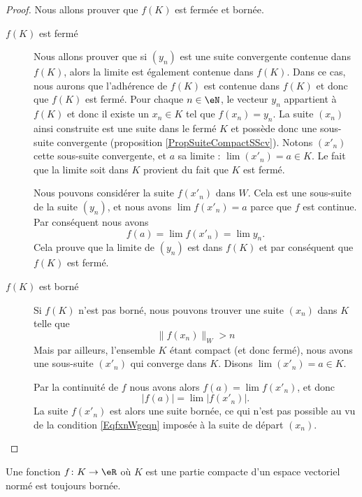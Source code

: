 \begin{proof}
	Nous allons prouver que $f(K)$ est fermée et bornée.
	\begin{description}
		\item[$f(K)$ est fermé] Nous allons prouver que si $(y_n)$ est une suite convergente contenue dans $f(K)$, alors la limite est également contenue dans $f(K)$. Dans ce cas, nous aurons que l'adhérence de $f(K)$ est contenue dans $f(K)$ et donc que $f(K)$ est fermé. Pour chaque $n\in\eN$, le vecteur $y_n$ appartient à $f(K)$ et donc il existe un $x_n\in K$ tel que $f(x_n)=y_n$. La suite $(x_n)$ ainsi construite est une suite dans le fermé $K$ et possède donc une sous-suite convergente (proposition \ref{PropSuiteCompactSScv}). Notons $(x'_n)$ cette sous-suite convergente, et $a$ sa limite : $\lim(x'_n)=a\in K$. Le fait que la limite soit dans $K$ provient du fait que $K$ est fermé.

			Nous pouvons considérer la suite $f(x'_n)$ dans $W$. Cela est une sous-suite de la suite $(y_n)$, et nous avons $\lim f(x'_n)=a$ parce que $f$ est continue. Par conséquent nous avons
			\begin{equation}
				f(a)=\lim f(x'_n)=\lim y_n.
			\end{equation}
			Cela prouve que la limite de $(y_n)$ est dans $f(K)$ et par conséquent que $f(K)$ est fermé.

		\item[$f(K)$ est borné]
			Si $f(K)$ n'est pas borné, nous pouvons trouver une suite $(x_n)$ dans $K$ telle que
			\begin{equation}		\label{EqfxnWgeqn}
				\| f(x_n) \|_W>n
			\end{equation}
			Mais par ailleurs, l'ensemble $K$ étant compact (et donc fermé), nous avons une sous-suite $(x'_n)$ qui converge dans $K$. Disons $\lim(x'_n)=a\in K$. 
			
			Par la continuité de $f$ nous avons alors $f(a)=\lim f(x'_n)$, et donc
			\begin{equation}
				| f(a) |=\lim | f(x'_n) |.
			\end{equation}
			La suite $f(x'_n)$ est alors une suite bornée, ce qui n'est pas possible au vu de la condition \eqref{EqfxnWgeqn} imposée à la suite de départ $(x_n)$.
	\end{description}
\end{proof}

\begin{corollary}	\label{CorFnContinueCompactBorne}
	Une fonction $f\colon K\to \eR$ où $K$ est une partie compacte d'un espace vectoriel normé est toujours bornée.
\end{corollary}

